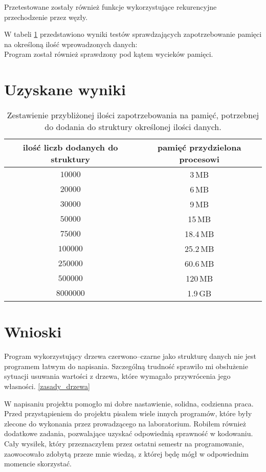 \documentclass[12pt,a4paper,twoside]{article}
\begin{document}
Przetestowane zostały również funkcje wykorzystujące rekurencyjne przechodzenie przez węzły.

W tabeli \ref{tab:1} przedstawiono wyniki testów sprawdzających zapotrzebowanie pamięci na określoną ilość wprowadzonych danych: \\

Program został również sprawdzony pod kątem wycieków pamięci.

\section{Uzyskane wyniki}


\begin{center} \small
\begin{table}[htb]
\begin{tabular}{ | c | c | } 
\hline
 \bfseries{ilość liczb dodanych do struktury} & \bfseries{pamięć przydzielona procesowi} \\ 
\hline
 $10000$ & \mbox{3$\,$MB} \\ 
\hline
 $20000$ & \mbox{6$\,$MB} \\
\hline
 $30000$ & \mbox{9$\,$MB} \\
\hline
 $50000$ & \mbox{15$\,$MB} \\
\hline
 $75000$ & \mbox{18.4$\,$MB} \\
\hline
 $100000$ & \mbox{25.2$\,$MB} \\
\hline
 $250000$ & \mbox{60.6$\,$MB} \\
\hline
 $500000$ & \mbox{120$\,$MB} \\
\hline
 $8000000$ & \mbox{1.9$\,$GB} \\
\hline
\end{tabular}
\caption{Zestawienie przybliżonej ilości zapotrzebowania na pamięć, potrzebnej do dodania do struktury określonej ilości danych.}
\label{tab:1}
\end{table}
\end{center}

\section{Wnioski}
Program wykorzystujący drzewa czerwono–czarne jako strukturę danych nie jest programem łatwym do napisania. Szczególną trudność sprawiło mi obsłużenie sytuacji usuwania wartości z drzewa, które wymagało przywrócenia jego własności. \ref{zasady_drzewa}

W napisaniu projektu pomogło mi dobre nastawienie, solidna, codzienna praca. Przed przystąpieniem do projektu pisałem wiele innych programów, które były zlecone do wykonania przez prowadzącego na laboratorium. Robiłem również dodatkowe zadania, pozwalające uzyskać odpowiednią sprawność w kodowaniu. Cały wysiłek, który przeznaczyłem przez ostatni semestr na programowanie, zaowocowało zdobytą przeze mnie wiedzą, z której będę mógł w odpowiednim momencie skorzystać.
\end{document}
